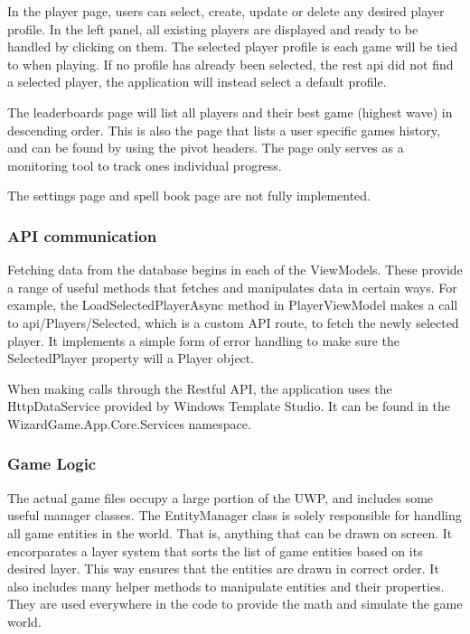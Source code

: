 \documentclass[12pt]{article}
\begin{document}
        In the player page, users can select, create, update or delete any desired player profile. In the left panel, all existing players are displayed and ready to be handled by clicking on them. The selected player profile is each game will be tied to when playing. If no profile has already been selected, the rest api did not find a selected player, the application will instead select a default profile.

        The leaderboards page will list all players and their best game (highest wave) in descending order. This is also the page that lists a user specific games history, and can be found by using the pivot headers. The page only serves as a monitoring tool to track ones individual progress.
        
        The settings page and spell book page are not fully implemented.

        \subsubsection{API communication}

        Fetching data from the database begins in each of the ViewModels. These provide a range of useful methods that fetches and manipulates data in certain ways. For example, the LoadSelectedPlayerAsync method in PlayerViewModel makes a call to api/Players/Selected, which is a custom API route, to fetch the newly selected player. It implements a simple form of error handling to make sure the SelectedPlayer property will a Player object.

        When making calls through the Restful API, the application uses the HttpDataService provided by Windows Template Studio. It can be found in the WizardGame.App.Core.Services namespace.

        \subsubsection{Game Logic}

        The actual game files occupy a large portion of the UWP, and includes some useful manager classes. The EntityManager class is solely responsible for handling all game entities in the world. That is, anything that can be drawn on screen. It encorparates a layer system that sorts the list of game entities based on its desired layer. This way ensures that the entities are drawn in correct order. It also includes many helper methods to manipulate entities and their properties. They are used everywhere in the code to provide the math and simulate the game world.
\end{document}
